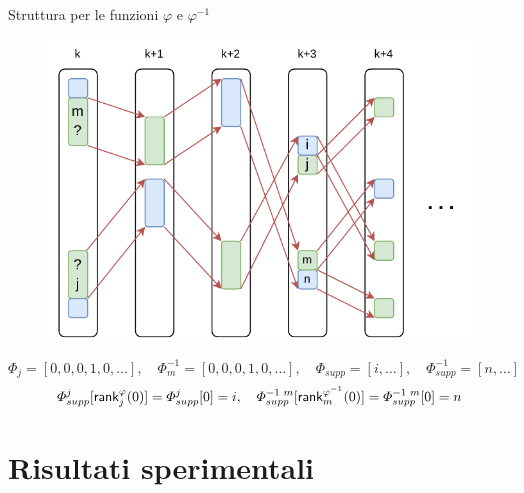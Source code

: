 \documentclass[]{beamer}
\def\rank{\mbox{\rm {\sf rank}}}
\begin{document}
\begin{frame}{Struttura per le funzioni $\varphi$ e $\varphi^{-1}$}
  \begin{figure}[H]
    \centering
    \includegraphics[scale = 0.6]{img/phi.pdf}   
  \end{figure}
  {\footnotesize{\[\varPhi_j=[0,0,0,1,0, \ldots],\quad
        \varPhi^{-1}_m=[0,0,0,1,0,\ldots],\quad
        \varPhi_{supp}=[i,\ldots],\quad
        \varPhi^{-1}_{supp}=[n,\ldots]\]}}
  \[\varPhi_{supp}^j[\rank^\varphi_j(0)]=\varPhi_{supp}^j[0]=i,\quad
    \varPhi^{-1\,\,m}_{supp}[\rank^{\varphi^{-1}}_m(0)]=\varPhi^{-1\,\,m}_{supp}[0]=n\] 
\end{frame}
\section{Risultati sperimentali}
\end{document}
